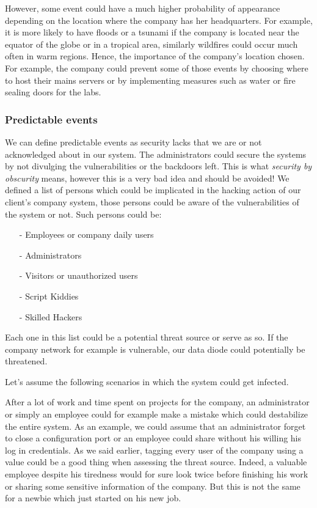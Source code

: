 \documentclass[a4paper,10pt]{article}
\begin{document}
However, some event could have a much higher probability of appearance depending on the location where the company has her headquarters. For example, it is more likely to have floods or a tsunami if the company is located near the equator of the globe or in a tropical area, similarly wildfires could occur much often in warm regions. Hence, the importance of the company's location chosen. For example, the company could prevent some of those events by choosing where to host their mains servers or by implementing measures such as water or fire sealing doors for the labs.

\subsubsection{Predictable events}
We can define predictable events as security lacks that we are or not acknowledged about in our system. The administrators could secure the systems by not divulging the vulnerabilities or the backdoors left. This is what \emph{security by obscurity} means, however this is a very bad idea and should be avoided! We defined a list of persons which could be implicated in the hacking action of our client's company system, those persons could be aware of the vulnerabilities of the system or not. Such persons could be:
\begin{enumerate}
\item[-] Employees or company daily users
\item[-] Administrators
\item[-] Visitors or unauthorized users
\item[-] Script Kiddies
\item[-] Skilled Hackers
\end{enumerate}

Each one in this list could be a potential threat source or serve as so. If the company network for example is vulnerable, our data diode could potentially be threatened.

Let's assume the following scenarios in which the system could get infected.

After a lot of work and time spent on projects for the company, an administrator or simply an employee could for example make a mistake which could destabilize the entire system. As an example, we could assume that an administrator forget to close a configuration port or an employee could share without his willing his log in credentials.
As we said earlier, tagging every user of the company using a value could be a good thing when assessing the threat source. Indeed, a valuable employee despite his tiredness would for sure look twice before finishing his work or sharing some sensitive information of the company. But this is not the same for a newbie which just started on his new job.
\end{document}
